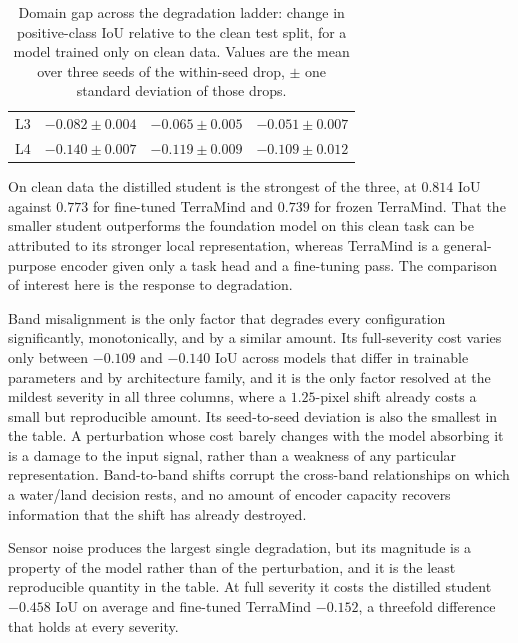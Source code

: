 \begin{table}[htbp]
\begin{tabular}{lccc}
        \quad L3             & $-0.082 \pm 0.004$          & $-0.065 \pm 0.005$ & $-0.051 \pm 0.007$          \\
        \quad L4             & $-0.140 \pm 0.007$          & $-0.119 \pm 0.009$ & $\mathbf{-0.109} \pm 0.012$ \\
        \bottomrule
    \end{tabular}
    \caption[Domain Gap Across the Degradation Ladder]{Domain gap across the degradation ladder: change in positive-class \acs{IoU} relative to the clean test split, for a model trained only on clean data.
        Values are the mean over three seeds of the within-seed drop, $\pm$ one standard deviation of those drops.
    }
    \label{tab:ladder-domain-gap}
\end{table}

On clean data the distilled student is the strongest of the three, at $0.814$ IoU against $0.773$ for fine-tuned TerraMind and $0.739$ for frozen TerraMind.
That the smaller student outperforms the foundation model on this clean task can be attributed to its stronger local representation, whereas TerraMind is a general-purpose encoder given only a task head and a fine-tuning pass.
The comparison of interest here is the response to degradation.

Band misalignment is the only factor that degrades every configuration significantly, monotonically, and by a similar amount.
Its full-severity cost varies only between $-0.109$ and $-0.140$ IoU across models that differ in trainable parameters and by architecture family, and it is the only factor resolved at the mildest severity in all three columns, where a $1.25$-pixel shift already costs a small but reproducible amount.
Its seed-to-seed deviation is also the smallest in the table.
A perturbation whose cost barely changes with the model absorbing it is a damage to the input signal, rather than a weakness of any particular representation.
Band-to-band shifts corrupt the cross-band relationships on which a water/land decision rests, and no amount of encoder capacity recovers information that the shift has already destroyed.

Sensor noise produces the largest single degradation, but its magnitude is a property of the model rather than of the perturbation, and it is the least reproducible quantity in the table.
At full severity it costs the distilled student $-0.458$ IoU on average and fine-tuned TerraMind $-0.152$, a threefold difference that holds at every severity.

